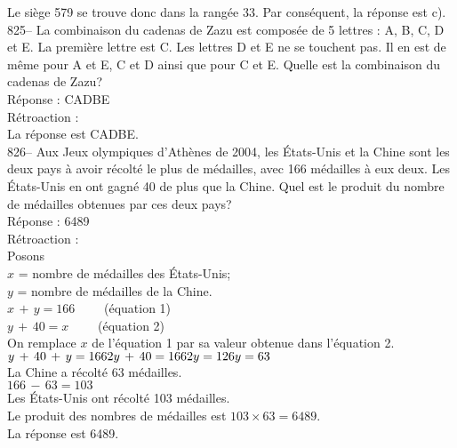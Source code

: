 ﻿\documentclass[letterpaper, 12pt]{article}
\begin{document}
Le si\`ege 579 se trouve donc dans la rang\'ee 33.  Par cons\'equent, la
r\'eponse est c).\\

825-- La combinaison du cadenas de Zazu est compos\'ee de 5 lettres : A, B,
C, D et E.  La premi\`ere lettre est C.  Les lettres D et E ne se touchent
pas.  Il en est de m\^eme pour A et E, C et D ainsi que pour C et E.  Quelle
est la combinaison du cadenas de Zazu?\\

R\'eponse : CADBE\\

R\'etroaction : \\
La r\'eponse est CADBE.\\

826-- Aux Jeux olympiques d'Ath\`enes de 2004, les \'Etats-Unis et la Chine
sont les deux pays \`a avoir r\'ecolt\'e le plus de m\'edailles,  avec 166
m\'edailles \`a eux deux.  Les \'Etats-Unis en ont gagn\'e 40 de plus que la
Chine.  Quel est le produit du nombre de m\'edailles obtenues par ces deux
pays?\\

R\'eponse : 6489\\

R\'etroaction : \\
Posons\\
$x$ = nombre de m\'edailles des \'Etats-Unis;\\
$y$ = nombre de m\'edailles de la Chine.\\

$x\,+\,y=166 \qquad$ (\'equation 1)\\
$y\,+\,40=x \qquad$ (\'equation 2)\\

On remplace $x$ de l'\'equation 1 par sa valeur obtenue dans l'\'equation
2.\\
$y\,+\,40\,+\,y=166\\
2y\,+\,40=166\\
2y=126\\
y=63$\\
La Chine a r\'ecolt\'e 63 m\'edailles.\\

$166\,-\,63=103$\\
Les \'Etats-Unis ont r\'ecolt\'e 103 m\'edailles.  \\

Le produit des nombres de m\'edailles est $103\times63=6489$.\\
La r\'eponse est 6489.\\
\end{document}
